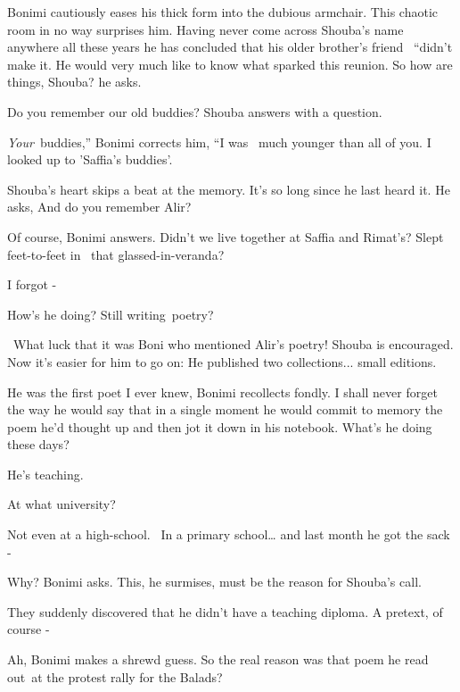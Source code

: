 \documentclass[letterpaper]{article}
\begin{document}
Bonimi cautiously eases his thick form into the dubious armchair. This chaotic room in no way surprises him. Having
never come across Shouba's name anywhere all these years he has concluded that his older brother's friend \ {}``didn't
make it{\textquotedbl}. He would very much like to know what sparked this reunion. {\textquotedbl}So how are things,
Shouba?{\textquotedbl} he asks.

{\textquotedbl}Do you remember our old buddies?{\textquotedbl} Shouba answers with a question.

{\textquotedbl}\textit{Your}~buddies,'' Bonimi corrects him, ``I was ~much younger than all of you. I looked up to
'Saffia's buddies'.{\textquotedbl} 

Shouba's heart skips a beat at the memory. It's so long since he last heard it. He asks, {\textquotedbl}And do you
remember Alir?{\textquotedbl}

{\textquotedbl}Of course,{\textquotedbl} Bonimi answers. {\textquotedbl}Didn't we live together at Saffia and Rimat's?
Slept feet-to-feet in{~} that glassed-in-veranda?{\textquotedbl} 

{\textquotedbl}I forgot -{\textquotedbl} 

{\textquotedbl}How's he doing? Still writing~poetry?{\textquotedbl}

~What luck that it was Boni who mentioned Alir's poetry! Shouba is encouraged. Now it's easier for him to go on:
{\textquotedbl}He published two collections... small{ }editions.{\textquotedbl}

{\textquotedbl}He was the first poet I ever knew,{\textquotedbl} Bonimi recollects fondly. {\textquotedbl}I shall never
forget the way he would say that in a single moment he would commit to memory the poem he'd thought up and then jot it
down in his notebook. What's he doing these days?{\textquotedbl}

{\textquotedbl}He's teaching.{\textquotedbl} 

{\textquotedbl}At what university?{\textquotedbl}

{\textquotedbl}Not even {at} a high-school.{ \ }{In a} primary
school{\dots} and last month he got the sack -{\textquotedbl} 

{\textquotedbl}Why?{\textquotedbl} Bonimi asks. This, he surmises, must be the reason for Shouba's call. 

{\textquotedbl}They suddenly discovered that he didn't have a teaching diploma. A pretext, of course -{\textquotedbl}

{\textquotedbl}Ah,{\textquotedbl} Bonimi makes a shrewd guess. {\textquotedbl}So the real reason was that poem he read
out~at the protest rally for the Balads?{\textquotedbl}
\end{document}
